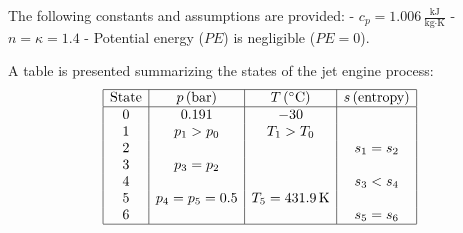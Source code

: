The following constants and assumptions are provided:  
- \( c_p = 1.006 \, \frac{\text{kJ}}{\text{kg·K}} \)  
- \( n = \kappa = 1.4 \)  
- Potential energy (\( PE \)) is negligible (\( PE = 0 \)).  

A table is presented summarizing the states of the jet engine process:  
\[
\begin{array}{|c|c|c|c|}
\hline
\text{State} & p \, (\text{bar}) & T \, (^\circ\text{C}) & s \, (\text{entropy}) \\
\hline
0 & 0.191 & -30 & \\
1 & p_1 > p_0 & T_1 > T_0 & \\
2 & & & s_1 = s_2 \\
3 & p_3 = p_2 & & \\
4 & & & s_3 < s_4 \\
5 & p_4 = p_5 = 0.5 & T_5 = 431.9 \, \text{K} & \\
6 & & & s_5 = s_6 \\
\hline
\end{array}
\]